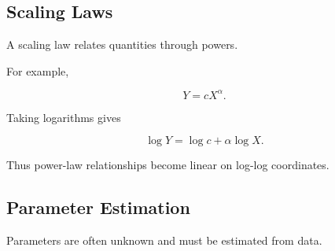 
\subsection{Scaling Laws}
\label{subsec:modeling-scaling-laws}

A scaling law relates quantities through powers.

For example,

\[
\boxed{
Y
=
cX^\alpha.
}
\]

Taking logarithms gives

\[
\boxed{
\log Y
=
\log c
+
\alpha\log X.
}
\]

Thus power-law relationships become linear on log-log coordinates.

\subsection{Parameter Estimation}
\label{subsec:model-parameter-estimation}

Parameters are often unknown and must be estimated from data.

